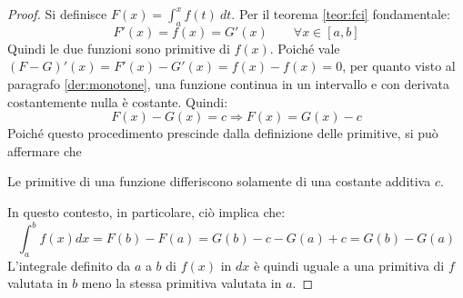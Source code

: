 \begin{proof}
	Si definisce $F(x)=\int_a^x f(t)~dt$. Per il teorema \ref{teor:fci} fondamentale:
	\[
		F'(x)=f(x)=G'(x)\qquad\forall x\in[a,b]
	\]
	Quindi le due funzioni sono primitive di $f(x)$. Poiché vale $(F-G)'(x)=F'(x)-G'(x)=f(x)-f(x)=0$, per quanto visto al paragrafo \vref{der:monotone}, una funzione continua in un intervallo e con derivata costantemente nulla è costante. Quindi:
	\[
		F(x)-G(x)=c\Rightarrow F(x)=G(x)-c
	\]
	Poiché questo procedimento prescinde dalla definizione delle primitive, si può affermare che
	\begin{propo} \label{propo:primitive}
		Le primitive di una funzione differiscono solamente di una costante additiva $c$.
	\end{propo}
	In questo contesto, in particolare, ciò implica che:
	\[
		\int_a^b f(x)dx=F(b)-F(a)=G(b)-c-G(a)+c=G(b)-G(a)
	\]
	L'integrale definito da $a$ a $b$ di $f(x)$ in $dx$ è quindi uguale a una primitiva di $f$ valutata in $b$ meno la stessa primitiva valutata in $a$.
\end{proof}
